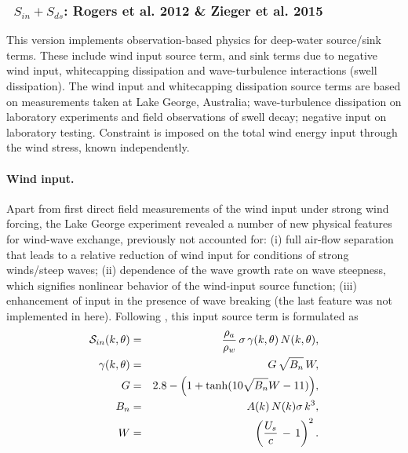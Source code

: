 \vsssub
\subsubsection{~$S_{in} + S_{ds}$: Rogers et al. 2012 \& Zieger et al. 2015} \label{sec:ST6}
\vsssub


\noindent
This version implements observation-based physics for deep-water source/sink terms. These include wind input
source term, and sink terms due to negative wind input, whitecapping
dissipation and wave-turbulence interactions (swell dissipation).
The wind input and whitecapping dissipation source terms are based on
measurements taken at Lake George, Australia; wave-turbulence dissipation
on laboratory experiments and field observations of swell decay; negative
input on laboratory testing. Constraint is imposed on the total wind
energy input through the wind stress, known independently.

\paragraph{Wind input.} Apart from first direct field measurements
of the wind input under strong wind forcing,  the Lake George experiment
revealed a number of new physical features for wind-wave exchange,
previously not accounted for:
(i) full air-flow separation that leads to a relative reduction of
wind input for conditions of strong winds/steep waves;
(ii) dependence of the wave growth rate on wave steepness,
which signifies nonlinear behavior of the wind-input source function;
(iii) enhancement of input in the presence of wave breaking
\citep{art:Dea06,art:Bea07} (the last feature was not implemented in here).
Following \citet{art:RBW12}, this input source term is formulated as
\begin{eqnarray}
{\cal S}_{in}(k,\theta) & = & \frac{\rho_a}{\rho_w}\, \sigma\,\gamma(k,\theta)\,N(k,\theta)  ,
\label{eq:ST601} \\ \gamma(k,\theta) &=& G\,\sqrt{B_n}\,W  ,
\label{eq:ST602} \\
G                &=& 2.8-\Bigl (1+\tanh (10\sqrt{B_n}W-11) \Bigr)  ,
\label{eq:ST603} \\
B_n              &=& A(k)\,N(k)\sigma\,k^3  ,
\label{eq:ST604} \\
W                &=& \left (\frac{U_s}{c}\,-\,1 \right )^2  .
\label{eq:ST605}
\end{eqnarray}

